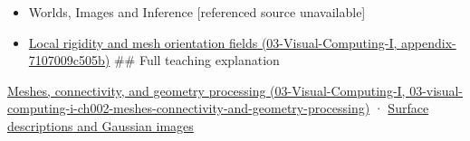\begin{itemize}
\item
  {Worlds, Images and Inference {[}referenced source unavailable{]}}
\item
  \href{../03-Visual-Computing-I/main.pdf\#nameddest=appendix-7107009c505b}{Local rigidity and mesh orientation fields (03-Visual-Computing-I, appendix-7107009c505b)} \#\# Full teaching explanation
\end{itemize}

\href{../03-Visual-Computing-I/main.pdf\#nameddest=03-visual-computing-i-ch002-meshes-connectivity-and-geometry-processing}{Meshes, connectivity, and geometry processing (03-Visual-Computing-I, 03-visual-computing-i-ch002-meshes-connectivity-and-geometry-processing)} · \hyperref[04-visual-computing-ii-ch032-surface-descriptions-and-gaussian-images]{Surface descriptions and Gaussian images}
